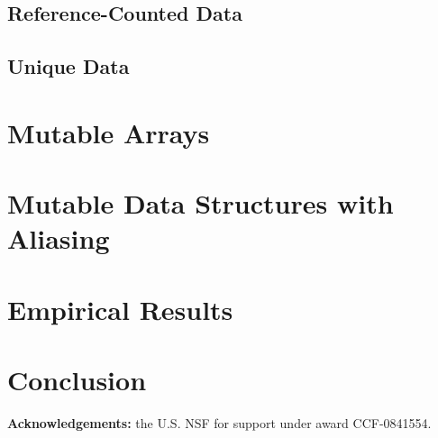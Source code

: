 \documentclass[9pt,natbib]{sigplanconf}
\begin{document}
\subsection{Reference-Counted Data}

\subsection{Unique Data}

\section{Mutable Arrays}

\section{Mutable Data Structures with Aliasing}

\section{Empirical Results}

\section{Conclusion}

\textbf{Acknowledgements:} the U.S. NSF for support under award CCF-0841554.




\end{document}
